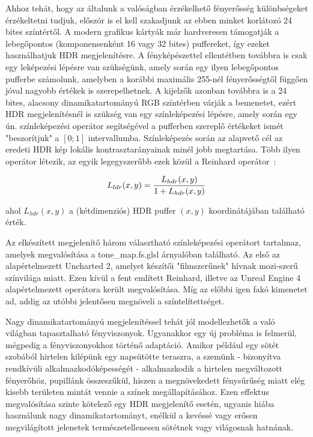 Ahhoz tehát, hogy az általunk a valóságban érzékelhető fényerősség különbségeket érzékeltetni tudjuk, először is el kell szakadjunk az ebben minket korlátozó 24 bites színtértől. A modern grafikus kártyák már hardveresen támogatják a lebegőpontos (komponensenként 16 vagy 32 bites) puffereket, így ezeket használhatjuk HDR megjelenítésre. A fényképészettel ellentétben továbbra is csak egy leképezési lépésre van szükségünk, amely során egy ilyen lebegőpontos pufferbe számolunk, amelyben a korábbi maximális 255-nél fényerősségtől függően jóval nagyobb értékek is szerepelhetnek. A kijelzők azonban továbbra is a 24 bites, alacsony dinamikatartományú RGB színtérben várják a bemenetet, ezért HDR megjelenítésnél is szükség van egy színleképezési lépésre, amely során egy ún. színleképezési operátor segítségével a pufferben szereplő értékeket ismét "beszorítjuk" a \([0; 1]\) intervallumba. Színleképezés során az alapvető cél az eredeti HDR kép lokális kontrasztarányainak minél jobb megtartása. Több ilyen operátor létezik, az egyik legegyszerűbb ezek közül a Reinhard operátor~\cite{reinhard2002photographic}:

\[
L_{ldr}(x, y) = { L_{hdr}(x, y) \over 1 + L_{hdr}(x, y) }
\]

ahol \(L_{hdr}(x, y)\) a (kétdimenziós) HDR puffer \((x, y)\) koordinátájában található érték.

Az elkészített megjelenítő három választható színleképezési operátort tartalmaz, amelyek megvalósítása a tone\_map.fs.glsl árnyalóban található. Az első az alapértelmezett Uncharted 2, amelyet készítői "filmszerűnek" hívnak mozi-szerű színvilága miatt. Ezen kívül a fent említett Reinhard, illetve az Unreal Engine 4 alapértelmezett operátora került megvalósítása. Míg az előbbi igen fakó kimenetet ad, addig az utóbbi jelentősen megnöveli a színtelítettséget.

Nagy dinamikatartományú megjelenítéssel tehát jól modellezhetők a való világban tapasztalható fényviszonyok. Ugyanakkor egy új probléma is felmerül, mégpedig a fényviszonyokhoz történő adaptáció. Amikor például egy sötét szobából hirtelen kilépünk egy napsütötte teraszra, a szemünk - bizonyítva rendkívüli alkalmazkodóképességét - alkalmazkodik a hirtelen megváltozott fényerőhöz, pupillánk összeszűkül, hiszen a megnövekedett fénysűrűség miatt elég kisebb területen mintát vennie a színek megállapításához. Ezen effektus megvalósítása szinte kötelező egy HDR megjelenítő esetén, ugyanis hiába használunk nagy dinamikatartományt, enélkül a kevéssé vagy erősen megvilágított jelenetek természetellenesen sötétnek vagy világosnak hatnának.

